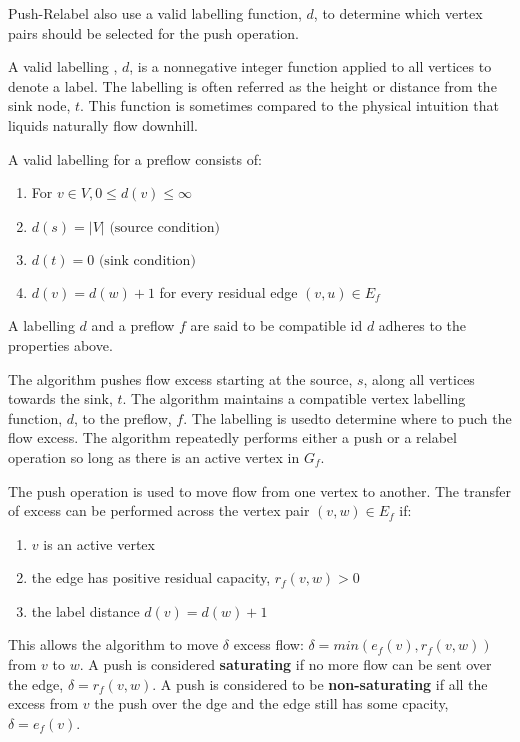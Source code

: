 \begin{definition}[Labelling]
	Push-Relabel also use a valid labelling function, $d$, to determine which vertex pairs should be selected for the push operation.
\end{definition}
A valid labelling , $d$, is a nonnegative integer function applied to all vertices to denote a label. The labelling is often referred as the height or distance from the sink node, $t$. This function is sometimes compared to the physical intuition that liquids naturally flow downhill.

A valid labelling for a preflow consists of:
\begin{enumerate}
	\item For $v \in V, 0 \leq d(v) \leq \infty$
	\item $d(s) = |V| \text{ (source condition)}$
	\item $d(t) = 0 \text{ (sink condition)}$
	\item $d(v) = d(w) + 1$ for every residual edge $(v,u) \in E_f$
\end{enumerate}
A labelling $d$ and a preflow $f$ are said to be compatible id $d$ adheres to the properties above.

The algorithm pushes flow excess starting at the source, $s$, along all vertices towards the sink, $t$. The algorithm maintains a compatible vertex labelling function, $d$, to the preflow, $f$. The labelling is usedto determine where to puch the flow excess. The algorithm repeatedly performs either a push or a relabel operation so long as there is an active vertex in $G_f$.

\begin{definition}
	The push operation is used to move flow from one vertex to another. The transfer of excess can be performed across the vertex pair $(v,w) \in E_f$ if:
	\begin{enumerate}
		\item $v$ is an active vertex
		\item the edge has positive residual capacity, $r_f(v,w)>0$
		\item the label distance $d(v) = d(w)+1$
	\end{enumerate}
\end{definition}
This allows the algorithm to move $\delta$ excess flow: $\delta = min (e_f(v), r_f(v,w))$ from $v$ to $w$. A push is considered \textbf{saturating} if no more flow can be sent over the edge, $\delta = r_f(v,w)$. A push is considered to be \textbf{non-saturating} if all the excess from $v$ the push over the dge and the edge still has some cpacity, $\delta = e_f(v)$.


